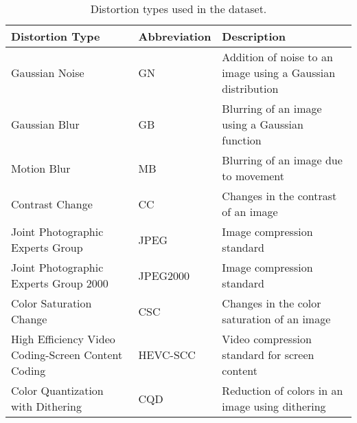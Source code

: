 \begin{table}[h!]
\centering
\caption{Distortion types used in the dataset.}
\begin{tabular}{|p{6cm}|l|p{6cm}|}
\hline
\textbf{Distortion Type} & \textbf{Abbreviation} & \textbf{Description} \\
\hline
Gaussian Noise & GN & Addition of noise to an image using a Gaussian distribution \\
\hline
Gaussian Blur & GB & Blurring of an image using a Gaussian function \\
\hline
Motion Blur & MB & Blurring of an image due to movement \\
\hline
Contrast Change & CC & Changes in the contrast of an image \\
\hline
Joint Photographic Experts Group & JPEG & Image compression standard \\
\hline
Joint Photographic Experts Group 2000 & JPEG2000 & Image compression standard \\
\hline
Color Saturation Change & CSC & Changes in the color saturation of an image \\
\hline
High Efficiency Video Coding-Screen Content Coding & HEVC-SCC & Video compression standard for screen content \\
\hline
Color Quantization with Dithering & CQD & Reduction of colors in an image using dithering \\
\hline
\end{tabular}
\label{tab:distortion_types}
\end{table}


